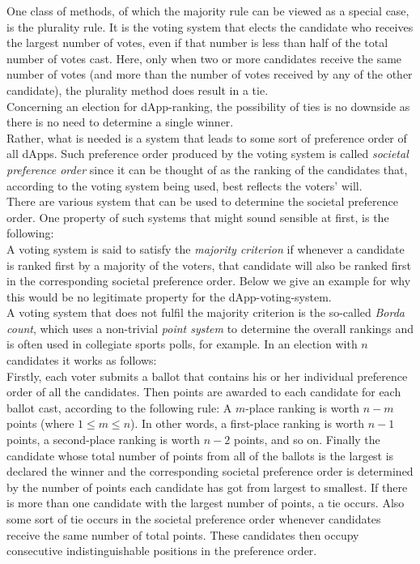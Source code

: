 One class of methods, of which the majority rule can be viewed as a special case, is the plurality rule. It is the voting system that elects the candidate who receives the largest number of votes, even if that number is less than half of the total number of votes cast. Here, only when two or more candidates receive the same number of votes (and more than the number of votes received by any of the other candidate), the plurality method does result in a tie. \\
Concerning an election for dApp-ranking, the possibility of ties is no downside as there is no need to determine a single winner.\\ %
Rather, what is needed is a system that leads to some sort of preference order of all dApps. Such preference order produced by the voting system is called {\emph{societal preference order}} since it can be thought of as the ranking of the candidates that, according to the voting system being used, best reflects the voters' will. \\
There are various system that can be used to determine the societal preference order. One property of such systems that might sound sensible at first, is the following: \\
A voting system is said to satisfy the {\emph{majority criterion}} if whenever a candidate is ranked first by a majority of the voters, that candidate will also be ranked first in the corresponding societal preference order. Below we give an example for why this would be no legitimate property for the dApp-voting-system.\\
A voting system that does not fulfil the majority criterion is the so-called {\emph{Borda count}}, which uses a non-trivial {\emph{point system}} to determine the overall rankings and is often used in collegiate sports polls, for example. In an election with $n$ candidates it works as follows: \\
Firstly, each voter submits a ballot that contains his or her individual preference order of all the candidates. 
Then points are awarded to each candidate for each ballot cast, according to the following rule: 
A $m$-place ranking is worth $n-m$ points (where $1\leq m \leq n$). In other words, a first-place ranking is worth $n-1$ points, a second-place ranking is worth $n-2$ points, and so on. 
Finally the candidate whose total number of points from all of the ballots is the largest is declared the winner and the corresponding societal preference order is determined by the number of points each candidate has got from largest to smallest. If there is more than one candidate with the largest number of points, a tie occurs. Also some sort of tie occurs in the societal preference order whenever candidates receive the same number of total points. These candidates then occupy consecutive indistinguishable positions in the preference order. \\
